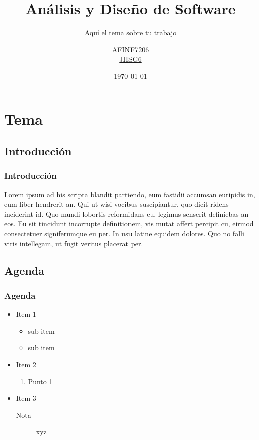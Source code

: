 \documentclass{beamer}
\title{Análisis y Diseño de Software}
\subtitle{Aquí el tema sobre tu trabajo}
\author{\href{http://www.iralis.org}{AFINF7206}\\\href{http://www.google.com}{JHSG6}}
\date{\today}
\institute{Ingeniería en Sistemas\\ tucorreo@unl.edu.ec}
\begin{document}
	
	\begin{frame}[plain,t]
		\titlepage
	\end{frame}

	\section{Tema}

	\subsection{Introducción}
		\begin{frame}
			\frametitle{Introducción}
			Lorem ipsum ad his scripta blandit partiendo, eum fastidii accumsan euripidis in, eum liber hendrerit an. Qui ut wisi 					vocibus suscipiantur, quo dicit ridens inciderint id. Quo mundi lobortis reformidans eu, legimus senserit 								definiebas an eos. Eu sit tincidunt incorrupte definitionem, vis mutat affert percipit cu, eirmod 										consectetuer signiferumque eu per. In usu latine equidem 		dolores. Quo no falli viris intellegam, ut fugit veritus 					placerat per.
\end{frame}

\subsection{Agenda}
\begin{frame}
\frametitle{Agenda}
\begin{itemize}
\item Item 1
	\begin{itemize}
	\item sub item
	\item sub item
	\end{itemize}
\item Item 2
	\begin{enumerate}
	\item Punto 1
	\end{enumerate}
\item Item 3
	\begin{description}
	\item[Nota] xyz
	\end{description}
\end{itemize}
\end{frame}
\end{document}
